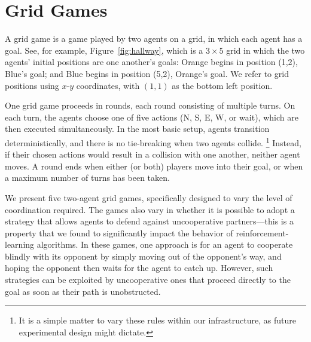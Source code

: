 
\section{Grid Games}
\label{sec:grid_games}

A grid game is a game played by two agents on a grid, in which each
agent has a goal.  See, for example, Figure~\ref{fig:hallway}, which
is a $3\times 5$ grid in which the two agents' initial positions are one
another's goals: Orange begins in position (1,2), Blue's goal; and
Blue begins in position (5,2), Orange's goal.  We refer to grid
positions using $x$-$y$ coordinates, with $(1,1)$ as the bottom left
position.

One grid game proceeds in rounds,
each round consisting of multiple turns.
On each turn, the agents choose one of five actions (N, S, E, W, or wait),
which are then executed simultaneously.  In the most basic setup,
agents transition deterministically, and there is no tie-breaking when
two agents collide.%
\footnote{It is a simple matter to vary these rules within our
  infrastructure, as future experimental design might dictate.}
%
Instead, if their chosen actions would result in a collision with one
another, neither agent moves.  A round ends when either (or both)
players move into their goal, or when a maximum number of turns has
been taken.

We present five two-agent grid games, specifically designed to
vary the level of coordination required.
The games also vary in whether it is possible to adopt a strategy that
allows agents to defend against uncooperative partners---this is a
property that we found to significantly impact the behavior of
reinforcement-learning algorithms.
%
% 
In these games, one approach is for an agent to cooperate blindly with
its opponent by simply moving out of the opponent's way, and hoping
the opponent then waits for the agent to catch up.  However, such
strategies can be exploited by uncooperative ones that proceed
directly to the goal as soon as their path is unobstructed.
 
